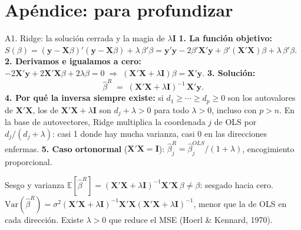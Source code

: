 \documentclass{beamer}
\newcommand{\E}{\mathbb{E}}
\newcommand{\Var}{\mathrm{Var}}
\newcommand{\1}{\mathbb{I}}
\begin{document}
\section{Apéndice: para profundizar}
\begin{frame}[noframenumbering]
\tableofcontents[currentsection]
\end{frame}

\begin{frame}{A1. Ridge: la solución cerrada y la magia de $\lambda\mathbf{I}$}
\small
\textbf{1. La función objetivo:} $S(\beta) = (\mathbf{y} - \mathbf{X}\beta)'(\mathbf{y} - \mathbf{X}\beta) + \lambda\,\beta'\beta = \mathbf{y}'\mathbf{y} - 2\beta'\mathbf{X}'\mathbf{y} + \beta'(\mathbf{X}'\mathbf{X})\beta + \lambda\,\beta'\beta$.
\pause
\textbf{2. Derivamos e igualamos a cero:} $-2\mathbf{X}'\mathbf{y} + 2\mathbf{X}'\mathbf{X}\beta + 2\lambda\beta = 0 \;\Rightarrow\; (\mathbf{X}'\mathbf{X} + \lambda\mathbf{I})\beta = \mathbf{X}'\mathbf{y}$.
\pause
\textbf{3. Solución:}
\[ \hat{\beta}^{R} \;=\; (\mathbf{X}'\mathbf{X} + \lambda \mathbf{I})^{-1}\,\mathbf{X}'\mathbf{y}. \]
\pause
\textbf{4. Por qué la inversa siempre existe:} si $d_1 \geq \cdots \geq d_p \geq 0$ son los autovalores de $\mathbf{X}'\mathbf{X}$, los de $\mathbf{X}'\mathbf{X} + \lambda\mathbf{I}$ son $d_j + \lambda > 0$ para todo $\lambda > 0$, incluso con $p > n$. En la base de autovectores, Ridge multiplica la coordenada $j$ de OLS por $d_j / (d_j + \lambda)$: casi 1 donde hay mucha varianza, casi 0 en las direcciones enfermas.
\pause
\textbf{5. Caso ortonormal} ($\mathbf{X}'\mathbf{X} = \mathbf{I}$): $\hat{\beta}^{R}_j = \hat{\beta}^{OLS}_j / (1 + \lambda)$, encogimiento proporcional.
\pause
\begin{block}{Sesgo y varianza}
$\E[\hat{\beta}^R] = (\mathbf{X}'\mathbf{X} + \lambda\mathbf{I})^{-1}\mathbf{X}'\mathbf{X}\,\beta \neq \beta$: sesgado hacia cero. $\Var(\hat{\beta}^R) = \sigma^2 (\mathbf{X}'\mathbf{X} + \lambda\mathbf{I})^{-1}\mathbf{X}'\mathbf{X}(\mathbf{X}'\mathbf{X} + \lambda\mathbf{I})^{-1}$, menor que la de OLS en cada dirección. Existe $\lambda > 0$ que reduce el MSE (Hoerl \& Kennard, 1970).
\end{block}
\end{frame}
\end{document}
